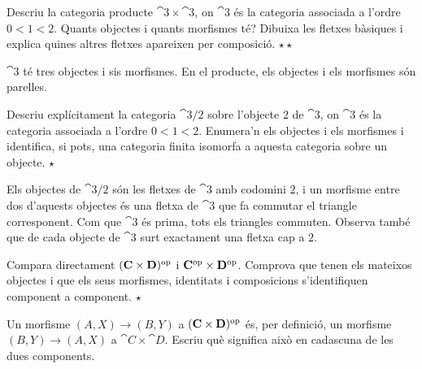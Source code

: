 \begin{exercici}
Descriu la categoria producte $\cat{3}\times\cat{3}$, on $\cat{3}$ és la categoria associada a l'ordre $0<1<2$. Quants objectes i quants morfismes té? Dibuixa les fletxes bàsiques i explica quines altres fletxes apareixen per composició. \hfill{\normalfont$\star\star$}
\begin{indicacio}
$\cat{3}$ té tres objectes i sis morfismes. En el producte, els objectes i els morfismes són parelles.
\end{indicacio}
\end{exercici}

\begin{exercici}
Descriu explícitament la categoria $\cat{3}/2$ sobre l'objecte $2$ de $\cat{3}$, on $\cat{3}$ és la categoria associada a l'ordre $0<1<2$. Enumera'n els objectes i els morfismes i identifica, si pots, una categoria finita isomorfa a aquesta categoria sobre un objecte. \hfill{\normalfont$\star$}
\begin{indicacio}
Els objectes de $\cat{3}/2$ són les fletxes de $\cat{3}$ amb codomini $2$, i un morfisme entre dos d'aquests objectes és una fletxa de $\cat{3}$ que fa commutar el triangle corresponent. Com que $\cat{3}$ és prima, tots els triangles commuten. Observa també que de cada objecte de $\cat{3}$ surt exactament una fletxa cap a $2$.
\end{indicacio}
\end{exercici}

\begin{exercici}
Compara directament $(\mathbf{C}\times\mathbf{D})^{\mathrm{op}}$ i $\mathbf{C}^{\mathrm{op}}\times\mathbf{D}^{\mathrm{op}}$. Comprova que tenen els mateixos objectes i que els seus morfismes, identitats i composicions s'identifiquen component a component. \hfill{\normalfont$\star$}
\begin{indicacio}
Un morfisme $(A,X)\to(B,Y)$ a $(\mathbf{C}\times\mathbf{D})^{\mathrm{op}}$ és, per definició, un morfisme $(B,Y)\to(A,X)$ a $\cat{C}\times\cat{D}$. Escriu què significa això en cadascuna de les dues components.
\end{indicacio}
\end{exercici}

